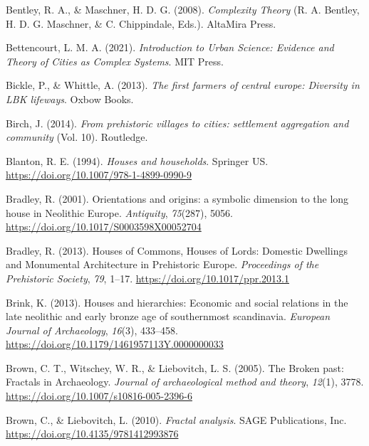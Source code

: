 \documentclass[
  12pt,
]{book}
\newlength{\cslhangindent}
\newlength{\cslentryspacingunit} %
\newenvironment{CSLReferences}[2] %
 {%
  \setlength{\parindent}{0pt}
  \ifodd #1
  \let\oldpar\par
  \def\par{\hangindent=\cslhangindent\oldpar}
  \fi
  \setlength{\parskip}{#2\cslentryspacingunit}
 }%
 {}
\begin{document}
\begin{CSLReferences}{1}{0}
\leavevmode{}%
Bentley, R. A., \& Maschner, H. D. G. (2008). \emph{Complexity Theory} (R. A. Bentley, H. D. G. Maschner, \& C. Chippindale, Eds.). AltaMira Press.

\leavevmode{}%
Bettencourt, L. M. A. (2021). \emph{Introduction to Urban Science: Evidence and Theory of Cities as Complex Systems}. MIT Press.

\leavevmode{}%
Bickle, P., \& Whittle, A. (2013). \emph{The first farmers of central europe: Diversity in LBK lifeways}. Oxbow Books.

\leavevmode{}%
Birch, J. (2014). \emph{From prehistoric villages to cities: settlement aggregation and community} (Vol. 10). Routledge.

\leavevmode{}%
Blanton, R. E. (1994). \emph{Houses and households}. Springer US. \url{https://doi.org/10.1007/978-1-4899-0990-9}

\leavevmode{}%
Bradley, R. (2001). Orientations and origins: a symbolic dimension to the long house in Neolithic Europe. \emph{Antiquity}, \emph{75}(287), 5056. \url{https://doi.org/10.1017/S0003598X00052704}

\leavevmode{}%
Bradley, R. (2013). Houses of Commons, Houses of Lords: Domestic Dwellings and Monumental Architecture in Prehistoric Europe. \emph{Proceedings of the Prehistoric Society}, \emph{79}, 1--17. \url{https://doi.org/10.1017/ppr.2013.1}

\leavevmode{}%
Brink, K. (2013). Houses and hierarchies: Economic and social relations in the late neolithic and early bronze age of southernmost scandinavia. \emph{European Journal of Archaeology}, \emph{16}(3), 433--458. \url{https://doi.org/10.1179/1461957113Y.0000000033}

\leavevmode{}%
Brown, C. T., Witschey, W. R., \& Liebovitch, L. S. (2005). The Broken past: Fractals in Archaeology. \emph{Journal of archaeological method and theory}, \emph{12}(1), 3778. \url{https://doi.org/10.1007/s10816-005-2396-6}

\leavevmode{}%
Brown, C., \& Liebovitch, L. (2010). \emph{Fractal analysis}. SAGE Publications, Inc. \url{https://doi.org/10.4135/9781412993876}


\end{CSLReferences}
\end{document}
